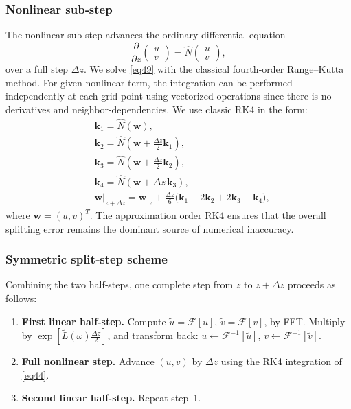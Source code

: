 \documentclass{article}
\begin{document}
    \subsubsection{Nonlinear sub‑step}
    The nonlinear sub‑step advances the ordinary differential equation
    \begin{equation} \label{eq49}
        \frac{\partial}{\partial z}\begin{pmatrix}u\\v\end{pmatrix}
        = \hat N\begin{pmatrix}u\\v\end{pmatrix},
    \end{equation}
    over a full step $\Delta z$.  We solve \eqref{eq49} with the classical fourth‑order Runge–Kutta method.
    For given nonlinear term, the integration can be performed independently
    at each grid point using vectorized operations since there is no derivatives and neighbor-dependencies. We use classic RK4 in the form:
    \begin{align}
        &\mathbf{k}_1 = \hat N(\mathbf{w}), \nonumber\\
        &\mathbf{k}_2 = \hat N(\mathbf{w} + \tfrac{\Delta z}{2}\mathbf{k}_1), \nonumber\\
        &\mathbf{k}_3 = \hat N(\mathbf{w} + \tfrac{\Delta z}{2}\mathbf{k}_2), \nonumber\\
        &\mathbf{k}_4 = \hat N(\mathbf{w} + \Delta z\,\mathbf{k}_3), \nonumber\\
        &\mathbf{w}\Big| _{z+\Delta z} = \mathbf{w}\Big| _{z} + \frac{\Delta z}{6}\bigl(\mathbf{k}_1+2\mathbf{k}_2+2\mathbf{k}_3+\mathbf{k}_4\bigr), \nonumber
    \end{align}
    where $\mathbf{w}=(u,v)^T$. The approximation order RK4 ensures that the overall splitting error remains the dominant source of numerical inaccuracy.
    
    \subsubsection{Symmetric split‑step scheme}
    Combining the two half‑steps, one complete step from $z$ to $z+\Delta z$ proceeds as follows:
    \begin{enumerate}
        \item \textbf{First linear half-step.} Compute $\tilde u = \mathcal{F}[u]$, $\tilde v = \mathcal{F}[v]$, by FFT.
        Multiply by $\exp[\widetilde L(\omega)\frac{\Delta z}{2}]$, and transform back:
        $u \leftarrow \mathcal{F}^{-1}[\tilde u]$, $v \leftarrow \mathcal{F}^{-1}[\tilde v]$.
        \item \textbf{Full nonlinear step.} Advance $(u,v)$ by $\Delta z$ using the RK4 integration of \eqref{eq44}.
        \item \textbf{Second linear half-step.} Repeat step~1.
    \end{enumerate}
\end{document}
